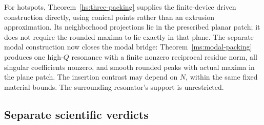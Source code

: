 For hotspots, Theorem~\ref{hs:three-packing} supplies the finite-device
driven construction directly, using conical points rather than an
extrusion approximation. Its neighborhood projections lie in the
prescribed planar patch; it does not require the rounded maxima to lie
exactly in that plane. The separate modal construction now closes the
modal bridge: Theorem~\ref{ms:modal-packing} produces one high-$Q$
resonance with a finite nonzero reciprocal residue norm, all singular
coefficients nonzero, and smooth rounded peaks with actual maxima in the
plane patch. The insertion contrast may depend on $N$, within the same
fixed material bounds. The surrounding resonator's support is unrestricted.

\subsection{Separate scientific verdicts}
\label{ver:verdicts}
